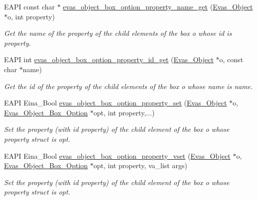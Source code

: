 \begin{DoxyCompactItemize}
EAPI const char $\ast$ \hyperlink{group__Evas__Object__Box_gad6b908faeca8fb7e16c002509a86ffab}{evas\_\-object\_\-box\_\-option\_\-property\_\-name\_\-get} (\hyperlink{group__Evas__Object__Group_ga9e19e6dd1f517a0ba437c0114d3e7c97}{Evas\_\-Object} $\ast$o, int property)
\begin{DoxyCompactList}\small\item\em Get the name of the property of the child elements of the box {\itshape o\/} whose id is {\itshape property\/}. \item\end{DoxyCompactList}\item 
EAPI int \hyperlink{group__Evas__Object__Box_ga1b799e5048ba268f47212e29cd8cc3fb}{evas\_\-object\_\-box\_\-option\_\-property\_\-id\_\-get} (\hyperlink{group__Evas__Object__Group_ga9e19e6dd1f517a0ba437c0114d3e7c97}{Evas\_\-Object} $\ast$o, const char $\ast$name)
\begin{DoxyCompactList}\small\item\em Get the id of the property of the child elements of the box {\itshape o\/} whose name is {\itshape name\/}. \item\end{DoxyCompactList}\item 
EAPI Eina\_\-Bool \hyperlink{group__Evas__Object__Box_gae2892100753fd70af716f415637f6d86}{evas\_\-object\_\-box\_\-option\_\-property\_\-set} (\hyperlink{group__Evas__Object__Group_ga9e19e6dd1f517a0ba437c0114d3e7c97}{Evas\_\-Object} $\ast$o, \hyperlink{group__Evas__Object__Box_gabbeb05bf47aaf7681e9d83a1b0055d20}{Evas\_\-Object\_\-Box\_\-Option} $\ast$opt, int property,...)
\begin{DoxyCompactList}\small\item\em Set the property (with id {\itshape property\/}) of the child element of the box {\itshape o\/} whose property struct is {\itshape opt\/}. \item\end{DoxyCompactList}\item 
EAPI Eina\_\-Bool \hyperlink{group__Evas__Object__Box_ga56c828490bb5778be68908147c32fa6d}{evas\_\-object\_\-box\_\-option\_\-property\_\-vset} (\hyperlink{group__Evas__Object__Group_ga9e19e6dd1f517a0ba437c0114d3e7c97}{Evas\_\-Object} $\ast$o, \hyperlink{group__Evas__Object__Box_gabbeb05bf47aaf7681e9d83a1b0055d20}{Evas\_\-Object\_\-Box\_\-Option} $\ast$opt, int property, va\_\-list args)
\begin{DoxyCompactList}\small\item\em Set the property (with id {\itshape property\/}) of the child element of the box {\itshape o\/} whose property struct is {\itshape opt\/}. \item\end{DoxyCompactList}\item 

\end{DoxyCompactItemize}
